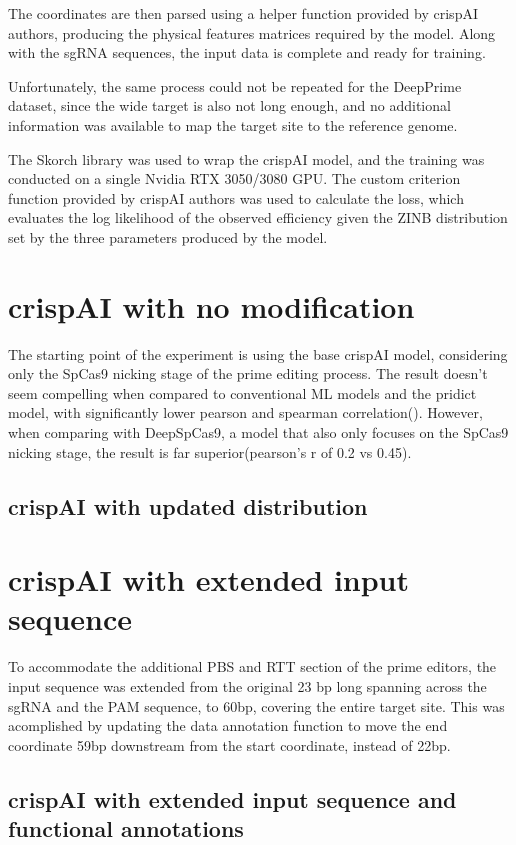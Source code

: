 \documentclass[a4,12pt]{article}
\begin{document}
The coordinates are then parsed using a helper function provided by crispAI authors, producing the physical features matrices required by the model. Along with the sgRNA sequences, the input data is complete and ready for training.

Unfortunately, the same process could not be repeated for the DeepPrime dataset, since the wide target is also not long enough, and no additional information was available to map the target site to the reference genome. 

The Skorch library was used to wrap the crispAI model, and the training was conducted on a single Nvidia RTX 3050/3080 GPU. The custom criterion function provided by crispAI authors was used to calculate the loss, which evaluates the log likelihood of the observed efficiency given the ZINB distribution set by the three parameters produced by the model. 

\section{crispAI with no modification}

The starting point of the experiment is using the base crispAI model, considering only the SpCas9 nicking stage of the prime editing process. The result doesn't seem compelling when compared to conventional ML models and the pridict model, with significantly lower pearson and spearman correlation(). However, when comparing with DeepSpCas9, a model that also only focuses on the SpCas9 nicking stage, the result is far superior(pearson's r of 0.2 vs 0.45).  

\subsection{crispAI with updated distribution}



\section{crispAI with extended input sequence}

To accommodate the additional PBS and RTT section of the prime editors, the input sequence was extended from the original 23 bp long spanning across the sgRNA and the PAM sequence, to 60bp, covering the entire target site. This was acomplished by updating the data annotation function to move the end coordinate 59bp downstream from the start coordinate, instead of 22bp.

\subsection{crispAI with extended input sequence and functional annotations}


\printbibliography
\end{document}
